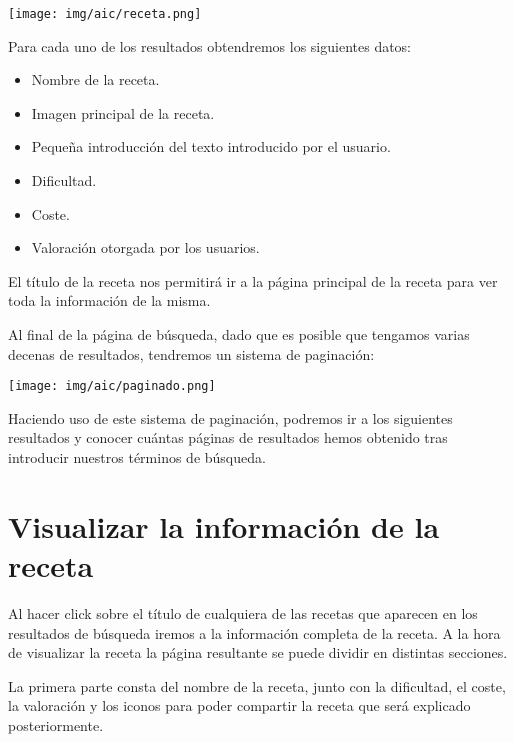 \documentclass{\ClassPath/viu-tfm-template}
\begin{document}
\begin{center}
    \vspace{-10pt}
    \texttt{[image: img/aic/receta.png]}
    \vspace{-20pt}
\end{center}

Para cada uno de los resultados obtendremos los siguientes datos:

\begin{itemize}
    \item Nombre de la receta.
    \item Imagen principal de la receta.
    \item Pequeña introducción del texto introducido por el usuario.
    \item Dificultad.
    \item Coste.
    \item Valoración otorgada por los usuarios.
\end{itemize}

El título de la receta nos permitirá ir a la página principal de la receta para ver toda la información de la misma.

Al final de la página de búsqueda, dado que es posible que tengamos varias decenas de resultados, tendremos un sistema de paginación:

\begin{center}
    \vspace{-10pt}
    \texttt{[image: img/aic/paginado.png]}
    \vspace{-20pt}
\end{center}

Haciendo uso de este sistema de paginación, podremos ir a los siguientes resultados y conocer cuántas páginas de resultados hemos obtenido tras introducir nuestros términos de búsqueda.

\section{Visualizar la información de la receta}

Al  hacer click sobre el título de cualquiera de las recetas que aparecen en los resultados de búsqueda iremos a la información completa de la receta. A la hora de visualizar la receta la página resultante se puede dividir en distintas secciones.

La primera parte consta del nombre de la receta, junto con la dificultad, el coste, la valoración y los iconos para poder compartir la receta que será explicado posteriormente.
\end{document}
